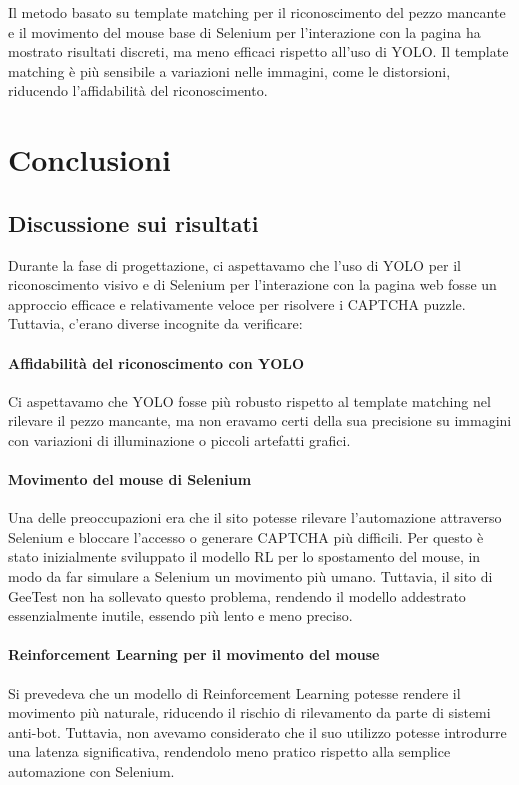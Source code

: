 \documentclass{article}
\begin{document}
Il metodo basato su template matching per il riconoscimento del pezzo mancante e il movimento del mouse base di Selenium per l’interazione con la pagina ha mostrato risultati discreti, ma meno efficaci rispetto all'uso di YOLO. Il template matching è più sensibile a variazioni nelle immagini, come le distorsioni, riducendo l'affidabilità del riconoscimento. 

\section{Conclusioni}

\subsection{Discussione sui risultati}
Durante la fase di progettazione, ci aspettavamo che l'uso di YOLO per il riconoscimento visivo e di Selenium per l'interazione con la pagina web fosse un approccio efficace e relativamente veloce per risolvere i CAPTCHA puzzle. Tuttavia, c’erano diverse incognite da verificare:
\paragraph{Affidabilità del riconoscimento con YOLO}
Ci aspettavamo che YOLO fosse più robusto rispetto al template matching nel rilevare il pezzo mancante, ma non eravamo certi della sua precisione su immagini con variazioni di illuminazione o piccoli artefatti grafici.
\paragraph{Movimento del mouse di Selenium}
Una delle preoccupazioni era che il sito potesse rilevare l'automazione attraverso Selenium e bloccare l’accesso o generare CAPTCHA più difficili. Per questo è stato inizialmente sviluppato il modello RL per lo spostamento del mouse, in modo da far simulare a Selenium un movimento più umano. Tuttavia, il sito di GeeTest non ha sollevato questo problema, rendendo il modello addestrato essenzialmente inutile, essendo più lento e meno preciso. 
\paragraph{Reinforcement Learning per il movimento del mouse}
Si prevedeva che un modello di Reinforcement Learning potesse rendere il movimento più naturale, riducendo il rischio di rilevamento da parte di sistemi anti-bot. Tuttavia, non avevamo considerato che il suo utilizzo potesse introdurre una latenza significativa, rendendolo meno pratico rispetto alla semplice automazione con Selenium.
\end{document}
